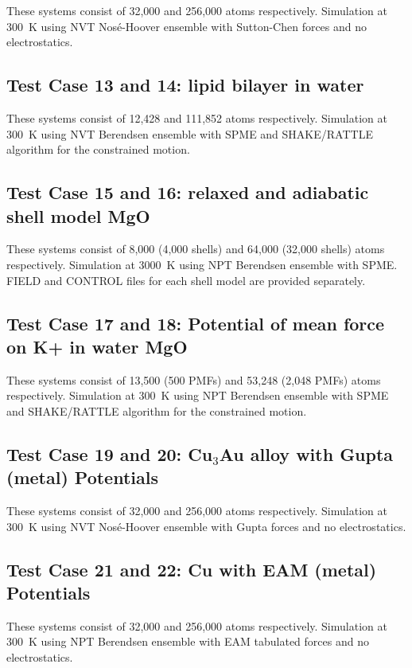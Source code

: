 These systems consist of 32,000 and 256,000 atoms respectively.
Simulation at 300~K using NVT Nos\'e-Hoover ensemble with Sutton-Chen forces and
no electrostatics.

\subsection{Test Case 13 and 14: lipid bilayer in water}

These systems consist of 12,428 and 111,852 atoms respectively.
Simulation at 300~K using NVT Berendsen ensemble with SPME and
SHAKE/RATTLE algorithm for the constrained motion.

\subsection{Test Case 15 and 16: relaxed and adiabatic shell model MgO}

These systems consist of 8,000 (4,000 shells) and 64,000 (32,000
shells) atoms respectively.  Simulation at 3000~K using NPT
Berendsen ensemble with SPME.  FIELD and CONTROL files for each
shell model are provided separately.

\subsection{Test Case 17 and 18: Potential of mean force on K+ in water MgO}

These systems consist of 13,500 (500 PMFs) and 53,248 (2,048 PMFs)
atoms respectively.  Simulation at 300~K using NPT Berendsen
ensemble with SPME and SHAKE/RATTLE algorithm for the constrained
motion.

\subsection{Test Case 19 and 20: Cu$_{3}$Au alloy with Gupta (metal) Potentials}

These systems consist of 32,000 and 256,000 atoms respectively.
Simulation at 300~K using NVT Nos\'e-Hoover ensemble with Gupta forces and
no electrostatics.

\subsection{Test Case 21 and 22: Cu with EAM (metal) Potentials}

These systems consist of 32,000 and 256,000 atoms respectively.
Simulation at 300~K using NPT Berendsen ensemble with EAM tabulated
forces and no electrostatics.

